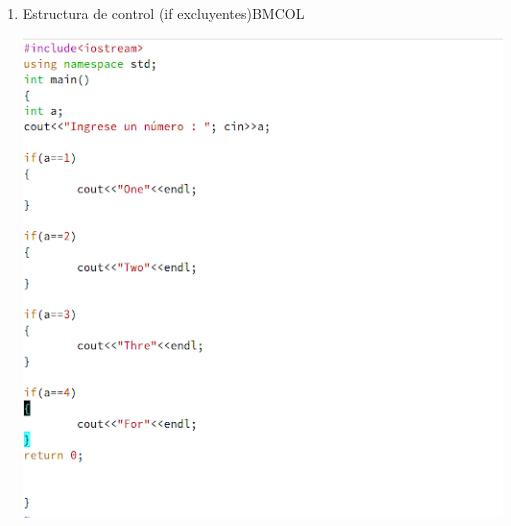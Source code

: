\documentclass[presentation, aspectratio=54]{beamer}
\begin{document}
\begin{enumerate}
\item Estructura de control (if excluyentes)\hfill{}\textsc{BMCOL}
\label{sec:org12671cf}
\begin{center}
\includegraphics[width=.9\linewidth]{./images/codigo/code-ifexcluyentes.png}
\end{center}
\end{enumerate}
\end{document}
